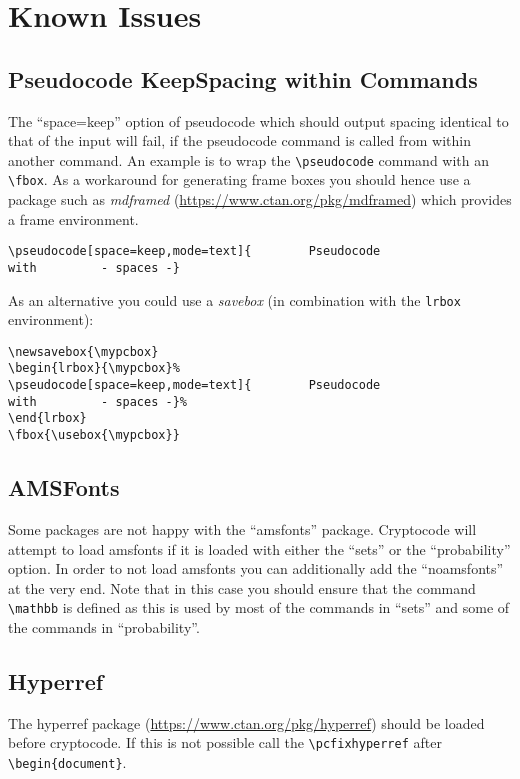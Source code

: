 \documentclass[a4paper]{report}
\begin{document}
\chapter{Known Issues}

\section{Pseudocode KeepSpacing within Commands}
\label{sec:keepindent-problem}
The \enquote{space=keep} option of pseudocode which should output spacing identical to that of the input 
will fail, if the pseudocode command is called from within another command. An example is to
wrap the \lstinline$\pseudocode$ command with an \lstinline$\fbox$. As a workaround for generating frame boxes you should hence
use a package such as \emph{mdframed} (\url{https://www.ctan.org/pkg/mdframed}) which provides a frame environment.

\begin{mdframed}
\end{mdframed}
\begin{lstlisting}
\pseudocode[space=keep,mode=text]{        Pseudocode                with         - spaces -}
\end{lstlisting}

As an alternative you could use a \emph{savebox} (in combination with the \lstinline$lrbox$ environment):
 
\newsavebox{\mypcbox}
\begin{lrbox}{\mypcbox}%
%
\end{lrbox}
\fbox{\usebox{\mypcbox}}

\begin{lstlisting}
\newsavebox{\mypcbox}
\begin{lrbox}{\mypcbox}%
\pseudocode[space=keep,mode=text]{        Pseudocode                with         - spaces -}%
\end{lrbox}
\fbox{\usebox{\mypcbox}}
\end{lstlisting}

\section{AMSFonts}
Some packages are not happy with the \enquote{amsfonts} package. Cryptocode will attempt to load amsfonts if it is loaded
with either the \enquote{sets} or the \enquote{probability} option. In order to not load amsfonts you can additionally add the
\enquote{noamsfonts} at the very end. Note that in this case you should ensure that the command \lstinline$\mathbb$ is defined
as this is used by most of the commands in \enquote{sets} and some of the commands in \enquote{probability}.

\section{Hyperref}
The hyperref package (\url{https://www.ctan.org/pkg/hyperref}) should be loaded before cryptocode. If this is not possible
call the \lstinline$\pcfixhyperref$ after \lstinline$\begin{document}$. 

\printindex
\end{document}
